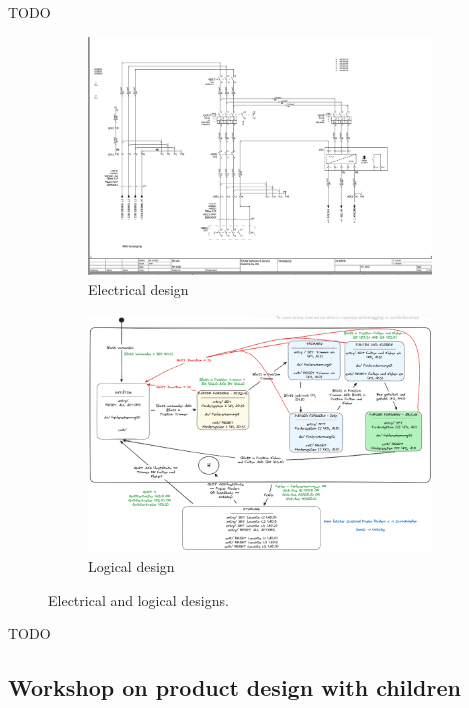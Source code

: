\documentclass{PDS}
\begin{document}
TODO

\begin{figure}[htbp]
    \centering
    \begin{subfigure}[b]{0.45\textwidth}
        \centering
        \includegraphics[width=\textwidth]{./figures/paper_electric.png}
        \caption{Electrical design}
    \end{subfigure}
    \hfill
    \begin{subfigure}[b]{0.5\textwidth}
        \centering
        \includegraphics[width=\textwidth]{./figures/paper_control.png}
        \caption{Logical design}
    \end{subfigure}
    \caption{Electrical and logical designs.}
\end{figure}

TODO

\subsection{Workshop on product design with children}
\end{document}
